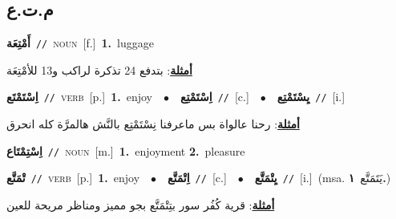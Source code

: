 \documentclass[10pt,a4paper,twoside]{article} %
\begin{document}
\begin{multicols}{2}
\vspace{-3mm}
\subsection*{\color{blue}\foreignlanguage{arabic}{م.ت.ع}\color{blue}{}} 

{\setlength\topsep{0pt}\textbf{\foreignlanguage{arabic}{أَمْتِعَة}}\ {\color{gray}\texttt{//}\color{black}}\ \textsc{noun}\ [f.]\ \textbf{1.}~luggage\  \begin{flushright}\color{gray}\foreignlanguage{arabic}{\textbf{\underline{\foreignlanguage{arabic}{أمثلة}}}: بتدفع 24 تذكرة لراكب و13 للأمْتِعَة}\end{flushright}\color{black}} \vspace{2mm}

{\setlength\topsep{0pt}\textbf{\foreignlanguage{arabic}{اِسْتَمْتَع}}\ {\color{gray}\texttt{//}\color{black}}\ \textsc{verb}\ [p.]\ \textbf{1.}~enjoy\ \ $\bullet$\ \ \setlength\topsep{0pt}\textbf{\foreignlanguage{arabic}{اِسْتَمْتِع}}\ {\color{gray}\texttt{//}\color{black}}\ [c.]\ \ $\bullet$\ \ \setlength\topsep{0pt}\textbf{\foreignlanguage{arabic}{يِسْتَمْتِع}}\ {\color{gray}\texttt{//}\color{black}}\ [i.]\  \begin{flushright}\color{gray}\foreignlanguage{arabic}{\textbf{\underline{\foreignlanguage{arabic}{أمثلة}}}: رحنا عالواة بس ماعرفنا نِسْتَمْتِع بالنَّش هالمرَّة كله انحرق}\end{flushright}\color{black}} \vspace{2mm}

{\setlength\topsep{0pt}\textbf{\foreignlanguage{arabic}{اِسْتِمْتَاع}}\ {\color{gray}\texttt{//}\color{black}}\ \textsc{noun}\ [m.]\ \textbf{1.}~enjoyment  \textbf{2.}~pleasure\ } \vspace{2mm}

{\setlength\topsep{0pt}\textbf{\foreignlanguage{arabic}{تْمَتَّع}}\ {\color{gray}\texttt{//}\color{black}}\ \textsc{verb}\ [p.]\ \textbf{1.}~enjoy\ \ $\bullet$\ \ \setlength\topsep{0pt}\textbf{\foreignlanguage{arabic}{اِتْمَتَّع}}\ {\color{gray}\texttt{//}\color{black}}\ [c.]\ \ $\bullet$\ \ \setlength\topsep{0pt}\textbf{\foreignlanguage{arabic}{يِتْمَتَّع}}\ {\color{gray}\texttt{//}\color{black}}\ [i.]\ \color{gray}(msa. \foreignlanguage{arabic}{يَتَمَتَّع}~\foreignlanguage{arabic}{\textbf{١.}})\color{black}\  \begin{flushright}\color{gray}\foreignlanguage{arabic}{\textbf{\underline{\foreignlanguage{arabic}{أمثلة}}}: قرية كُفُر سور بتِتْمَتَّع بجو مميز ومناظر مريحة للعين}\end{flushright}\color{black}} \vspace{2mm}


\end{multicols}
\end{document}
